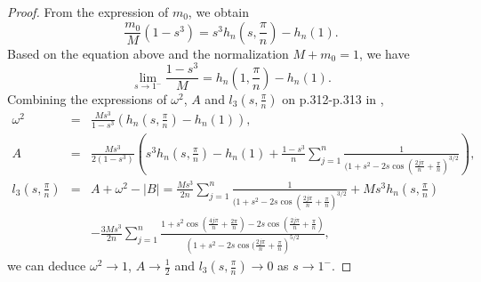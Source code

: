 \documentclass[11pt]{article}
\begin{document}
\begin{proof}\label{pi/n}
From the expression of $m_0$, we obtain
$$\frac{m_0}{M}({1-s^3})=s^3{h_n(s,\frac{\pi}{n})-h_n(1)}.$$
Based on the equation above and the normalization $M+m_0=1$, we have 
$$
   \lim_{s\to 1^{-}}\frac{1-s^3}{M}=h_n(1,\frac{\pi}{n})-h_n(1).
$$
Combining the expressions of $\omega^2$, $A$ and $l_3(s,\frac{\pi}{n})$ on p.312-p.313 in \cite{BaE}, 
\begin{eqnarray*}
   \omega^2&=&\frac{Ms^3}{1-s^3}(h_n(s,\frac{\pi}{n})-h_n(1)),\\
   A &=&\frac{Ms^3}{2(1-s^3)}\left(s^3h_n\left(s,\frac{\pi}{n}\right)-h_n(1)+\frac{1-s^3}{n}\sum_{j=1}^{n}\frac{1}{(1+s^2-2s\cos({\frac{2j\pi}{n}}+\frac{\pi}{n})^{3/2}}\right),\\
   l_3(s,\frac{\pi}{n})&=&A+\omega^2-|B|=\frac{Ms^3}{2n}\sum_{j=1}^{n}\frac{1}{(1+s^2-2s\cos({\frac{2j\pi}{n}}+\frac{\pi}{n})^{3/2}}+Ms^3h_n(s,\frac{\pi}{n})\\
   & &-\frac{3Ms^3}{2n}\sum_{j=1}^{n}\frac{1+s^2\cos\left({\frac{4j\pi}{n}}+\frac{2\pi}{n}\right)-2s\cos\left({\frac{2j\pi}{n}+\frac{\pi}{n}}\right)}{(1+s^2-2s\cos{(\frac{2j\pi}{n}}+\frac{\pi}{n})^{5/2}},
\end{eqnarray*}
we can deduce $\omega^2\to 1$, $A\to \frac{1}{2}$ and $l_3(s,\frac{\pi}{n})\to 0$ as $s\to 1^{-}$.


\end{proof}
\end{document}
